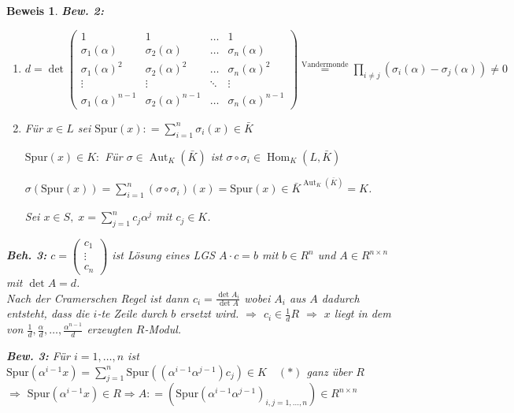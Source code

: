 \documentclass[a4paper,12pt]{scrbook}
\theoremstyle{break}
\theoremstyle{nonumberbreak}
\newtheorem{Bew}{Beweis}
\theoremstyle{nonumberplain}
\newcommand{\defeqr}[0]{\mathrel{\mathop:}=}
\DeclareMathOperator{\Aut}{Aut}
\DeclareMathOperator{\Hom}{Hom}
\begin{document}
\begin{Bew}
\textbf{Bew. 2:}
\begin{enumerate}
\item $d = \det
  \begin{pmatrix}
    1 & 1 & \dots & 1 \\
    \sigma_1(\alpha) & \sigma_2(\alpha) & \dots & \sigma_n(\alpha) \\
    \sigma_1(\alpha)^2 & \sigma_2(\alpha)^2 & \dots & \sigma_n(\alpha)^2 \\
    \vdots & \vdots & \ddots & \vdots \\
    \sigma_1(\alpha)^{n-1} & \sigma_2(\alpha)^{n-1} & \dots & \sigma_n(\alpha)^{n-1}
  \end{pmatrix}
  \overset{\text{Vandermonde}}{=} \displaystyle\prod_{i \not= j}
  (\sigma_i(\alpha) - \sigma_j(\alpha)) \not= 0$

\item Für $x \in L$ sei $\text{Spur}(x) \defeqr \sum_{i=1}^n \sigma_i(x) \in \bar{K}$

  $\text{Spur}(x) \in K:$ Für $\sigma \in \Aut_K(\bar{K})$ ist $\sigma \circ \sigma_i \in \Hom_K(L,\bar{K})$

  $\sigma(\text{Spur}(x)) = \sum_{i=1}^n (\sigma \circ \sigma_i)(x) = \text{Spur}(x) \in \bar{K}^{\Aut_K(\bar{K})} = K$.

  Sei $x \in S, \; x = \sum_{j=1}^n c_j \alpha^j$ mit $c_j \in K$.
\end{enumerate}

\textbf{Beh. 3:} $c = \begin{pmatrix} c_1\\ \vdots\\ c_n \end{pmatrix}$ ist
Lösung eines LGS $A \cdot c = b$ mit $b \in R^n$ und $A \in R^{n \times n}$
mit $\det A = d$.\\
Nach der Cramerschen Regel ist dann $c_i = \frac{\det A_i}{\det A}$ wobei
$A_i$ aus $A$ dadurch entsteht, dass die $i$-te Zeile durch $b$ ersetzt wird.
$\Rightarrow$ $c_i \in \frac{1}{d}R$ $\Rightarrow$ $x$ liegt in 
dem von $\frac{1}{d}, \frac{\alpha}{d}, \dots, \frac{\alpha^{n-1}}{d}$ erzeugten $R$-Modul.

\textbf{Bew. 3:} Für $i=1, \dots, n$ ist $\text{Spur}(\alpha^{i-1} x) = \sum_{j=1}^n \text{Spur}((\alpha^{i-1}\alpha^{j-1})c_j) \in K \quad (*)$ ganz über $R$\\
$\Rightarrow$ $\text{Spur}(\alpha^{i-1}x) \in R \Rightarrow A \defeqr (\text{Spur}(\alpha^{i-1} \alpha^{j-1})_{i,j = 1, \dots, n}) \in R^{n \times n}$


\end{Bew}
\end{document}
